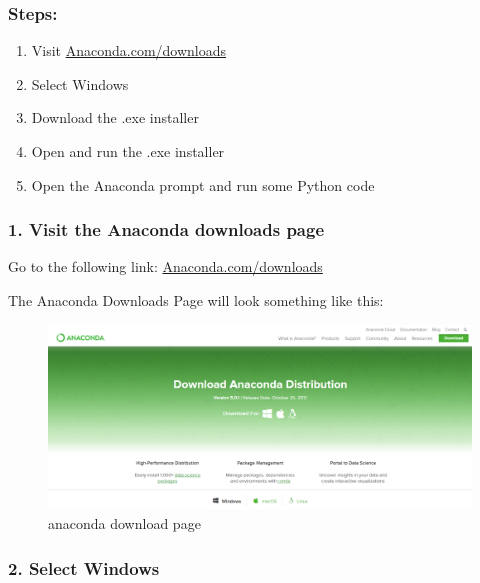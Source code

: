 \documentclass{book}
\makeatletter
\def\maxwidth{\ifdim\Gin@nat@width>\linewidth\linewidth
    \else\Gin@nat@width\fi}
\let\Oldincludegraphics\includegraphics
\renewcommand{\includegraphics}[1]{\Oldincludegraphics[width=.8\maxwidth]{#1}}
\makeatother
\begin{document}
\subsubsection{Steps:}\label{steps}

\begin{enumerate}
\def\labelenumi{\arabic{enumi}.}
\item
  Visit
  \href{https://www.anaconda.com/download/}{Anaconda.com/downloads}
\item
  Select Windows
\item
  Download the .exe installer
\item
  Open and run the .exe installer
\item
  Open the Anaconda prompt and run some Python code
\end{enumerate}
    




    
        \subsubsection{1. Visit the Anaconda downloads
page}\label{visit-the-anaconda-downloads-page}

Go to the following link:
\href{https://www.anaconda.com/download/}{Anaconda.com/downloads}

The Anaconda Downloads Page will look something like this:

\begin{figure}
\centering
\includegraphics{images/anaconda_download_page.png}
\caption{anaconda download page}
\end{figure}
    




    
        \subsubsection{2. Select Windows}\label{select-windows}
\end{document}
